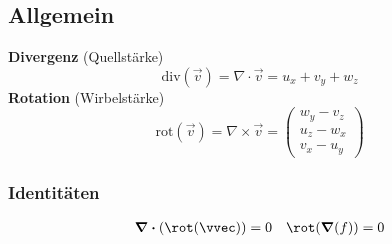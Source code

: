 \subsection{Allgemein}
    \textbf{Divergenz} (Quellstärke)
        $$
            \mathrm{div}(\vec{v}) = \nabla \cdot \vec{v} = u_x + v_y + w_z
        $$
    \textbf{Rotation} (Wirbelstärke)
        $$
            \mathrm{rot}(\vec{v}) = \nabla \times \vec{v} = 
            \begin{pmatrix}
                w_y - v_z\\ u_z - w_x\\v_x - u_y
            \end{pmatrix}
        $$
    \subsubsection{Identitäten}
        \vspace{-1em}
        \begin{align*}
            \div(\rot(\vvec)) = 0 && \rot(\grad(f)) = 0
        \end{align*}